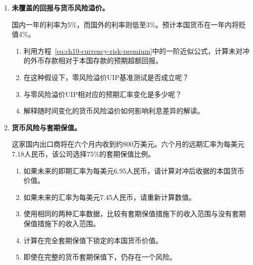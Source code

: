 \begin{enumerate}
\begin{enumerate}
\item 假设观察到的远期利率为7.30。在得出存在可交易套利机会的结论之前，还需要哪些额外的信息呢？

\item 请解释为什么CIP所暗示的远期汇率并不必然代表未来的即期汇率。

\end{enumerate}

\item \textbf{未覆盖的回报与货币风险溢价。}

国内一年的利率为5\%，而国外的利率则低至3\%。预计本国货币在一年内将贬值4\%。

\begin{enumerate}

\item 利用方程~\ref{eq:ch10-currency-risk-premium}中的一阶近似公式，计算未对冲的外币存款相对于本国存款的预期超额回报。

\item 在这种假设下，零风险溢价UIP基准测试是否成立呢？

\item 与零风险溢价UIP相对应的预期汇率变化是多少呢？

\item 解释随时间变化的货币风险溢价如何影响利息差异的解读。

\end{enumerate}

\item \textbf{货币风险与套期保值。}

这家国内出口商将在六个月内收到约800万美元。六个月的远期汇率为每美元7.18人民币，该公司选择75\%的套期保值比例。

\begin{enumerate}

\item 如果未来的即期汇率为每美元6.95人民币，请计算对冲后收据的本国货币价值。

\item 如果未来的汇率为每美元7.45人民币，请重新计算数值。

\item 使用相同的两种汇率数据，比较有套期保值措施下的收入范围与没有套期保值措施下的收入范围。

\item 计算在完全套期保值下锁定的本国货币价值。

\item 即使在完整的货币套期保值下，仍存在一个风险。

\end{enumerate}

\end{enumerate}


